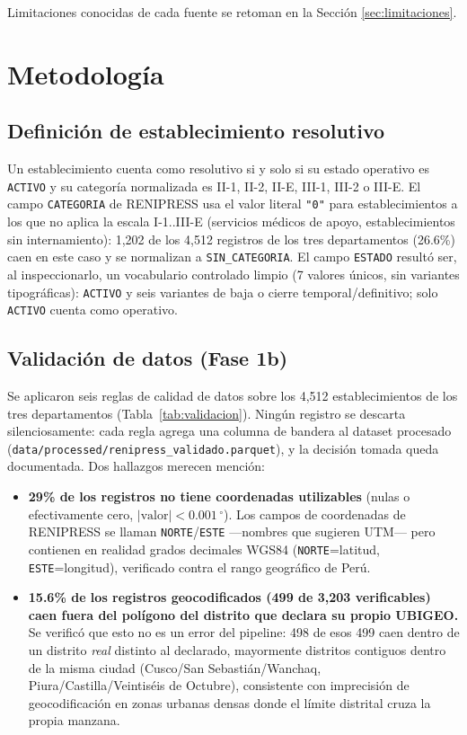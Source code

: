 \documentclass[11pt]{article}
\begin{document}
Limitaciones conocidas de cada fuente se retoman en la Secci\'on
\ref{sec:limitaciones}.

\section{Metodolog\'ia}

\subsection{Definici\'on de establecimiento resolutivo}

Un establecimiento cuenta como resolutivo si y solo si su estado operativo
es \texttt{ACTIVO} y su categor\'ia normalizada es II-1, II-2, II-E, III-1,
III-2 o III-E. El campo \texttt{CATEGORIA} de RENIPRESS usa el valor
literal \texttt{"0"} para establecimientos a los que no aplica la escala
I-1..III-E (servicios m\'edicos de apoyo, establecimientos sin
internamiento): 1{,}202 de los 4{,}512 registros de los tres departamentos
(26.6\%) caen en este caso y se normalizan a \texttt{SIN\_CATEGORIA}. El
campo \texttt{ESTADO} result\'o ser, al inspeccionarlo, un vocabulario
controlado limpio (7 valores \'unicos, sin variantes tipogr\'aficas):
\texttt{ACTIVO} y seis variantes de baja o cierre temporal/definitivo; solo
\texttt{ACTIVO} cuenta como operativo.

\subsection{Validaci\'on de datos (Fase 1b)}

Se aplicaron seis reglas de calidad de datos sobre los 4{,}512
establecimientos de los tres departamentos (Tabla~\ref{tab:validacion}).
Ning\'un registro se descarta silenciosamente: cada regla agrega una
columna de bandera al dataset procesado
(\texttt{data/processed/renipress\_validado.parquet}), y la decisi\'on
tomada queda documentada. Dos hallazgos merecen menci\'on:

\begin{itemize}
  \item \textbf{29\% de los registros no tiene coordenadas utilizables}
  (nulas o efectivamente cero, $|\text{valor}| < 0.001\,^{\circ}$). Los
  campos de coordenadas de RENIPRESS se llaman \texttt{NORTE}/\texttt{ESTE}
  ---nombres que sugieren UTM--- pero contienen en realidad grados
  decimales WGS84 (\texttt{NORTE}=latitud, \texttt{ESTE}=longitud),
  verificado contra el rango geogr\'afico de Per\'u.
  \item \textbf{15.6\% de los registros geocodificados (499 de 3{,}203
  verificables) caen fuera del pol\'igono del distrito que declara su
  propio UBIGEO.} Se verific\'o que esto no es un error del pipeline: 498
  de esos 499 caen dentro de un distrito \emph{real} distinto al
  declarado, mayormente distritos contiguos dentro de la misma ciudad
  (Cusco/San Sebasti\'an/Wanchaq, Piura/Castilla/Veintis\'eis de Octubre),
  consistente con imprecisi\'on de geocodificaci\'on en zonas urbanas
  densas donde el l\'imite distrital cruza la propia manzana.
\end{itemize}
\end{document}
